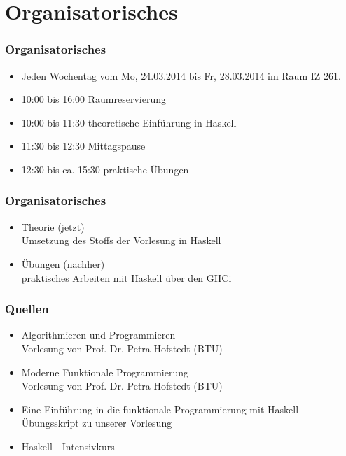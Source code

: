 \subtitle{Tag eins - Was ist Haskell} 
\date{24.03.2014}

\begin{frame}[plain]
\titlepage
\end{frame}

\section{Organisatorisches}
\begin{frame}
\frametitle{Organisatorisches}
\begin{block}{\vspace*{-3ex}}
	\begin{itemize}
	  \item Jeden Wochentag vom Mo, 24.03.2014 bis Fr, 28.03.2014 im Raum IZ 261.
	  \item 10:00 bis 16:00 Raumreservierung
	  \item 10:00 bis 11:30 theoretische Einführung in Haskell
	  \item 11:30 bis 12:30 Mittagspause
	  \item 12:30 bis ca. 15:30 praktische Übungen
	\end{itemize}
\end{block}
\end{frame}


\begin{frame}
\frametitle{Organisatorisches}
\begin{block}{\vspace*{-3ex}}
	\begin{itemize}
	  \item Theorie (jetzt)\\
	  		Umsetzung des Stoffs der Vorlesung in Haskell
	  \item Übungen (nachher)\\
	  		praktisches Arbeiten mit Haskell über den GHCi
	\end{itemize}
\end{block}
\end{frame}

\begin{frame}
\frametitle{Quellen}
\begin{block}{\vspace*{-3ex}}	
	\begin{itemize}
	  \item Algorithmieren und Programmieren\\ Vorlesung von Prof. Dr. Petra Hofstedt (BTU)
	  \item Moderne Funktionale Programmierung \\ Vorlesung von Prof. Dr. Petra Hofstedt (BTU)
	  \item Eine Einführung in die funktionale Programmierung mit Haskell \\ Übungsskript zu unserer Vorlesung
	  \item Haskell - Intensivkurs
	\end{itemize}
\end{block}
\end{frame}


